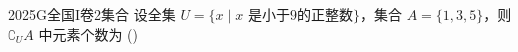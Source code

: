 
\begin{problem}{2025}{G}{全国I卷}{2}{集合}
设全集 $U=\{x\mid x \text{ 是小于9的正整数}\}$，集合 $A=\{1,3,5\}$，则 $\complement_U A$ 中元素个数为
(\hspace{1cm})
\begin{choices}
\end{choices}
\end{problem}